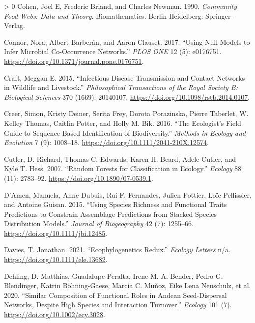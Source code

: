\documentclass[10pt,oneside]{article}
\newlength{\cslhangindent}
\newenvironment{CSLReferences}[3] %
 {%
  \setlength{\parindent}{0pt}
  \ifodd #1 \everypar{\setlength{\hangindent}{\cslhangindent}}\ignorespaces\fi
  \ifnum #2 > 0
  \setlength{\parskip}{#2\baselineskip}
  \fi
 }%
 {}
\begin{document}
\begin{CSLReferences}{1}{0}
\leavevmode\hypertarget{ref-Cohen1990ComFoo}{}%
Cohen, Joel E, Frederic Briand, and Charles Newman. 1990.
\emph{Community Food Webs: Data and Theory}. Biomathematics. Berlin
Heidelberg: Springer-Verlag.

\leavevmode\hypertarget{ref-Connor2017UsiNul}{}%
Connor, Nora, Albert Barberán, and Aaron Clauset. 2017. {``Using Null
Models to Infer Microbial Co-Occurrence Networks.''} \emph{PLOS ONE} 12
(5): e0176751. \url{https://doi.org/10.1371/journal.pone.0176751}.

\leavevmode\hypertarget{ref-Craft2015InfDis}{}%
Craft, Meggan E. 2015. {``Infectious Disease Transmission and Contact
Networks in Wildlife and Livestock.''} \emph{Philosophical Transactions
of the Royal Society B: Biological Sciences} 370 (1669): 20140107.
\url{https://doi.org/10.1098/rstb.2014.0107}.

\leavevmode\hypertarget{ref-Creer2016EcoSF}{}%
Creer, Simon, Kristy Deiner, Serita Frey, Dorota Porazinska, Pierre
Taberlet, W. Kelley Thomas, Caitlin Potter, and Holly M. Bik. 2016.
{``The Ecologist's Field Guide to Sequence-Based Identification of
Biodiversity.''} \emph{Methods in Ecology and Evolution} 7 (9):
1008--18. \url{https://doi.org/10.1111/2041-210X.12574}.

\leavevmode\hypertarget{ref-Cutler2007RanFor}{}%
Cutler, D. Richard, Thomas C. Edwards, Karen H. Beard, Adele Cutler, and
Kyle T. Hess. 2007. {``Random Forests for Classification in Ecology.''}
\emph{Ecology} 88 (11): 2783--92.
\url{https://doi.org/10.1890/07-0539.1}.

\leavevmode\hypertarget{ref-DAmen2015UsiSpe}{}%
D'Amen, Manuela, Anne Dubuis, Rui F. Fernandes, Julien Pottier, Loïc
Pellissier, and Antoine Guisan. 2015. {``Using Species Richness and
Functional Traits Predictions to Constrain Assemblage Predictions from
Stacked Species Distribution Models.''} \emph{Journal of Biogeography}
42 (7): 1255--66. \url{https://doi.org/10.1111/jbi.12485}.

\leavevmode\hypertarget{ref-Davies2021EcoRed}{}%
Davies, T. Jonathan. 2021. {``Ecophylogenetics Redux.''} \emph{Ecology
Letters} n/a. \url{https://doi.org/10.1111/ele.13682}.

\leavevmode\hypertarget{ref-Dehling2020SimCom}{}%
Dehling, D. Matthias, Guadalupe Peralta, Irene M. A. Bender, Pedro G.
Blendinger, Katrin Böhning-Gaese, Marcia C. Muñoz, Eike Lena Neuschulz,
et al. 2020. {``Similar Composition of Functional Roles in Andean
Seed-Dispersal Networks, Despite High Species and Interaction
Turnover.''} \emph{Ecology} 101 (7).
\url{https://doi.org/10.1002/ecy.3028}.


\end{CSLReferences}
\end{document}
